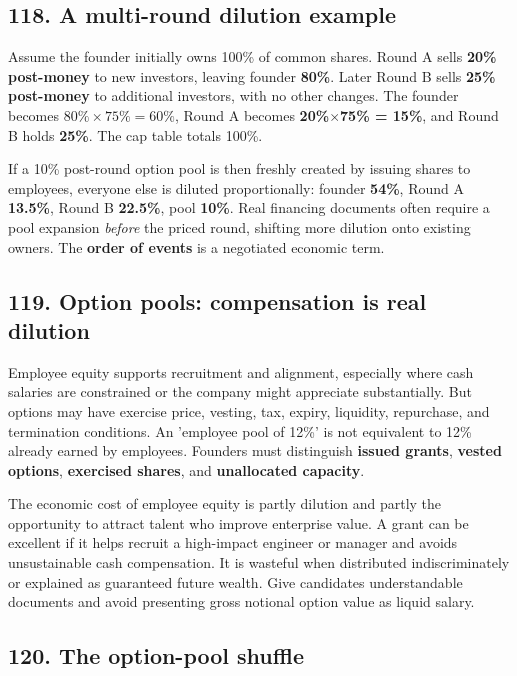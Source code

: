 \subsection{118. A multi-round dilution example}


Assume the founder initially owns 100\% of common shares. Round A sells \textbf{20\% post-money} to new investors, leaving founder \textbf{80\%}. Later Round B sells \textbf{25\% post-money} to additional investors, with no other changes. The founder becomes $80\% \times 75\% = 60\%$, Round A becomes \textbf{20\%$\times$75\% = 15\%}, and Round B holds \textbf{25\%}. The cap table totals 100\%.

If a 10\% post-round option pool is then freshly created by issuing shares to employees, everyone else is diluted proportionally: founder \textbf{54\%}, Round A \textbf{13.5\%}, Round B \textbf{22.5\%}, pool \textbf{10\%}. Real financing documents often require a pool expansion \textit{before} the priced round, shifting more dilution onto existing owners. The \textbf{order of events} is a negotiated economic term.

\subsection{119. Option pools: compensation is real dilution}


Employee equity supports recruitment and alignment, especially where cash salaries are constrained or the company might appreciate substantially. But options may have exercise price, vesting, tax, expiry, liquidity, repurchase, and termination conditions. An 'employee pool of 12\%' is not equivalent to 12\% already earned by employees. Founders must distinguish \textbf{issued grants}, \textbf{vested options}, \textbf{exercised shares}, and \textbf{unallocated capacity}.

The economic cost of employee equity is partly dilution and partly the opportunity to attract talent who improve enterprise value. A grant can be excellent if it helps recruit a high-impact engineer or manager and avoids unsustainable cash compensation. It is wasteful when distributed indiscriminately or explained as guaranteed future wealth. Give candidates understandable documents and avoid presenting gross notional option value as liquid salary.

\subsection{120. The option-pool shuffle}


